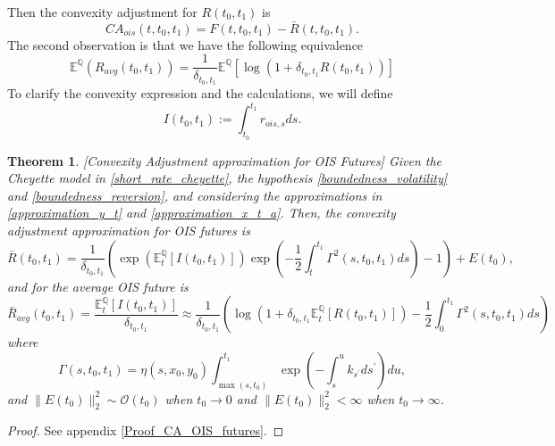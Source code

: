 \documentclass[a4paper,10pt]{article}
\newtheorem{theorem}{Theorem}[section]
\newcommand{\1}{\mathbf{1}}
\begin{document}
Then the convexity adjustment for $ R(t_0,t_1)$ is
\begin{equation}\label{R_ois_ca}
CA_{ois}(t,t_0,t_1) = F(t,t_0,t_1) - \bar{R}(t,t_0,t_1).
\end{equation}
The second observation is that we have the following equivalence
\begin{equation}\label{R_ois_avg}
\mathbb{E}^{\mathbb{Q}}\left(R_{avg}(t_0,t_1) \right) =\frac{1}{\delta_{t_0,t_1}} \mathbb{E}^{\mathbb{Q}}\left[ \log\left(1+ \delta_{t_0,t_1} R(t_0,t_1) \right) \right]  \end{equation}
To clarify the convexity expression and the calculations, we will define 
\begin{equation*}
I(t_0,t_1) := \int_{t_0}^{t_1} r_{ois,s} ds.
\end{equation*}

\begin{theorem}\label{Th_CA_OIS}[Convexity Adjustment approximation for OIS Futures]
Given the Cheyette model in \eqref{short_rate_cheyette}, the hypothesis \ref{boundedness_volatility} and \ref{boundedness_reversion}, and considering the approximations in \eqref{approximation_y_t} and \eqref{approximation_x_t_a}. Then, the convexity adjustment approximation for OIS futures is 
\begin{equation}\label{convexity_ois_future}
\bar{R}(t_0,t_1) = \frac{1}{\delta_{t_0,t_1}}\left(\exp\left(\mathbb{E}_t^{\mathbb{Q}}\left[I(t_0,t_1)\right]\right)\exp\left(-\frac{1}{2}\int_{t}^{t_1}\Gamma^{2}(s,t_0,t_1) ds\right) - 1\right) + E(t_0),
\end{equation}
and for the average OIS future is
\begin{equation}\label{convexity_avg_ois_future}
\bar{R}_{avg}(t_0,t_1) = \frac{\mathbb{E}_t^{\mathbb{Q}}\left[I(t_0,t_1)\right] }{\delta_{t_0,t_1}} \approx \frac{1}{\delta_{t_0,t_1}}\left(\log\left(1+\delta_{t_0,t_1}  \mathbb{E}_t^{\mathbb{Q}}\left[R(t_0,t_1)\right] \right) - \frac{1}{2}\int_{0}^{t_1}  \Gamma^{2}(s,t_0,t_1) ds\right)
\end{equation}
where  
\begin{equation}
\Gamma(s,t_0,t_1)= \eta(s,x_0,y_0)\int_{\max(s, t_{0})}^{t_1} \exp\left( -\int_{s}^{u} k_{s^{\prime}} ds^{\prime}\right)du, 
\end{equation}
and $\|E(t_0)\|^{2}_{2} \sim \mathcal{O}(t_0)$ when $t_0 \to 0$ and $\|E(t_0)\|^{2}_{2} < \infty$ when $t_0 \to \infty$.
\end{theorem}
\begin{proof}
See appendix \ref{Proof_CA_OIS_futures}.
\end{proof}
\end{document}
